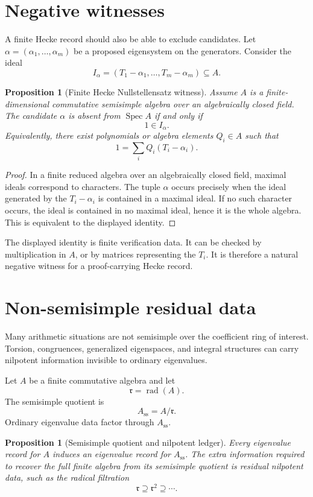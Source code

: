 \documentclass[11pt]{article}
\newtheorem{proposition}[theorem]{Proposition}
\DeclareMathOperator{\rad}{rad}
\DeclareMathOperator{\Spec}{Spec}
\begin{document}
\section{Negative witnesses}

A finite Hecke record should also be able to exclude candidates.
Let \(\alpha=(\alpha_1,\ldots,\alpha_m)\) be a proposed eigensystem on the generators.  Consider the ideal
\[
I_\alpha=(T_1-\alpha_1,\ldots,T_m-\alpha_m)\subseteq A.
\]

\begin{proposition}[Finite Hecke Nullstellensatz witness]
Assume \(A\) is a finite-dimensional commutative semisimple algebra over an algebraically closed field.  The candidate \(\alpha\) is absent from \(\Spec A\) if and only if
\[
1\in I_\alpha.
\]
Equivalently, there exist polynomials or algebra elements \(Q_i\in A\) such that
\[
1=\sum_i Q_i(T_i-\alpha_i).
\]
\end{proposition}

\begin{proof}
In a finite reduced algebra over an algebraically closed field, maximal ideals correspond to characters.  The tuple \(\alpha\) occurs precisely when the ideal generated by the \(T_i-\alpha_i\) is contained in a maximal ideal.  If no such character occurs, the ideal is contained in no maximal ideal, hence it is the whole algebra.  This is equivalent to the displayed identity.
\end{proof}

The displayed identity is finite verification data.  It can be checked by multiplication in \(A\), or by matrices representing the \(T_i\).  It is therefore a natural negative witness for a proof-carrying Hecke record.

\section{Non-semisimple residual data}

Many arithmetic situations are not semisimple over the coefficient ring of interest.  Torsion, congruences, generalized eigenspaces, and integral structures can carry nilpotent information invisible to ordinary eigenvalues.

Let \(A\) be a finite commutative algebra and let
\[
\mathfrak r=\rad(A).
\]
The semisimple quotient is
\[
A_{\mathrm{ss}}=A/\mathfrak r.
\]
Ordinary eigenvalue data factor through \(A_{\mathrm{ss}}\).

\begin{proposition}[Semisimple quotient and nilpotent ledger]
Every eigenvalue record for \(A\) induces an eigenvalue record for \(A_{\mathrm{ss}}\).  The extra information required to recover the full finite algebra from its semisimple quotient is residual nilpotent data, such as the radical filtration
\[
\mathfrak r\supseteq \mathfrak r^2\supseteq\cdots .
\]
\end{proposition}
\end{document}
